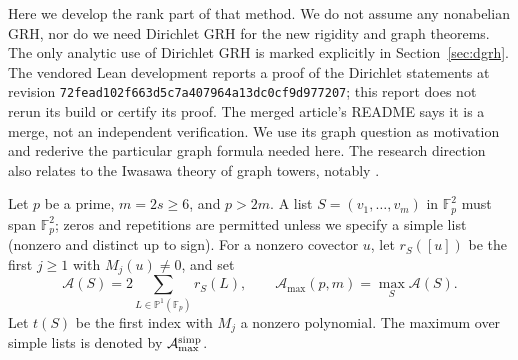 \documentclass[11pt]{article}
\theoremstyle{remark}\newtheorem{remark}[theorem]{Remark}
\newcommand{\F}{\mathbb F}
\newcommand{\Pj}{\mathbb P}
\newcommand{\A}{\mathcal A}
\begin{document}
Here we develop the rank part of that method. We do not assume any nonabelian GRH, nor do we need Dirichlet GRH for the new rigidity and graph theorems. The only analytic use of Dirichlet GRH is marked explicitly in Section~\ref{sec:dgrh}. The vendored Lean development reports a proof of the Dirichlet statements at revision \texttt{72fead102f663d5c7a407964a13dc0cf9d977207}; this report does not rerun its build or certify its proof. The merged article's README says it is a merge, not an independent verification. We use its graph question as motivation and rederive the particular graph formula needed here. The research direction also relates to the Iwasawa theory of graph towers, notably \cite{dubose,dion}.

Let $p$ be a prime, $m=2s\ge6$, and $p>2m$. A list $S=(v_1,\dots,v_m)$ in $\F_p^2$ must span $\F_p^2$; zeros and repetitions are permitted unless we specify a simple list (nonzero and distinct up to sign). For a nonzero covector $u$, let $r_S([u])$ be the first $j\ge1$ with $M_j(u)\ne0$, and set
\[
 \A(S)=2\sum_{L\in\Pj^1(\F_p)} r_S(L),\qquad
 \A_{\max}(p,m)=\max_S\A(S).
\]
Let $t(S)$ be the first index with $M_j$ a nonzero polynomial. The maximum over simple lists is denoted by $\A_{\max}^{\rm simp}$.
\end{document}
